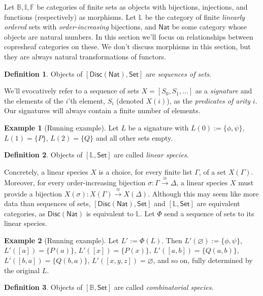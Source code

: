 \documentclass{article}
\theoremstyle{definition}
\newtheorem{definition}{Definition}[section]
\newtheorem{example}{Example}[section]
\newcommand{\BB}{\mathbb{B}}
\newcommand{\II}{\mathbb{I}}
\newcommand{\FF}{\mathbb{F}}
\newcommand{\LL}{\mathbb{L}}
\newcommand{\cat}[1]{\mathsf{#1}}
\newcommand{\Set}{\cat{Set}}
\begin{document}
 Let $\BB, \II,\FF$ be categories of finite sets as objects with bijections, injections, and functions (respectively) as morphisms. 
 Let $\LL$ be the category of finite {\it linearly ordered} sets with {\it order-increasing} bijections, and $\cat{Nat}$ be some category whose objects are natural numbers. 
 In this section we'll focus on relationships between copresheaf categories on these. 
 We don't discuss morphisms in this section, but they are always natural transformations of functors.

\begin{definition}
    \label{def:ds}
    Objects of $[\cat{Disc}(\cat{Nat}),\Set]$ are {\it sequences of sets}.
\end{definition}

We'll evocatively refer to a sequence of sets $X=[S_0, S_1, ...]$ as a {\it signature} and the elements of the $i$'th element, $S_i$ (denoted $X(i)$), as the {\it predicates of arity} $i$. Our signatures will always contain a finite number of elements.

\begin{example}[Running example]
    Let $L$ be a signature with $L(0):=\{\phi,\psi\}$, $L(1)=\{P\}$, $L(2)=\{Q\}$ and all other sets empty.
\end{example}


\begin{definition}
    \label{def:ls}
    Objects of $[\LL,\Set]$ are called {\it linear species}.
\end{definition}

Concretely, a linear species $X$ is a choice, for every finite list $\Gamma$, of a set $X(\Gamma)$. 
Moreover, for every order-increasing bijection $\sigma\colon \Gamma\overset{\cong}{\to} \Delta$, a linear species $X$ must provide a bijection $X(\sigma)\colon X(\Gamma)\overset{\cong}{\to}X(\Delta)$. 
Although this may seem like more data than sequences of sets, $[\cat{Disc}(\cat{Nat}),\Set]$ and $[\LL,\Set]$ are equivalent categories, as $\cat{Disc}(\cat{Nat})$ is equivalent to $\LL$. 
Let $\Phi$ send a sequence of sets to its linear species.


\begin{example}[Running example]
    Let $L':=\Phi(L)$. 
    Then $L'(\varnothing):=\{\phi,\psi\}$, $L'([a])=\{P(a)\}$, $L'([x])=\{P(x)\}$, $L'([a,b])=\{Q(a,b)\}$, $L'([b,a])=\{Q(b,a)\}$, $L'([x,y,z])=\varnothing$, and so on, fully determined by the original $L$.
\end{example}


\begin{definition}
    \label{def:cs}
    Objects of $[\BB,\Set]$ are called {\it combinatorial species}.
\end{definition}
\end{document}
